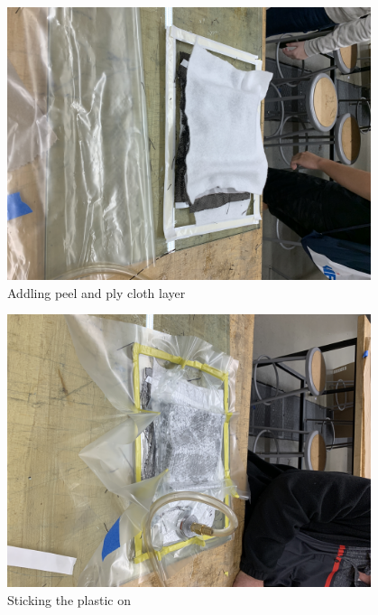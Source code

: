 \begin{figure}[htp]
\centering
\includegraphics[width=0.95\textwidth, angle=0]{Meetings/February/02-10-22/2-10-22_Hardware_Figure2 - Nathan Forrer.JPG}
\caption{Addling peel and ply cloth layer}
\label{fig:021022_5}
\end{figure}

\begin{figure}[htp]
\centering
\includegraphics[width=0.95\textwidth, angle=0]{Meetings/February/02-10-22/2-10-22_Hardware_Figure3 - Nathan Forrer.JPG}
\caption{Sticking the plastic on}
\label{fig:021022_6}
\end{figure}


